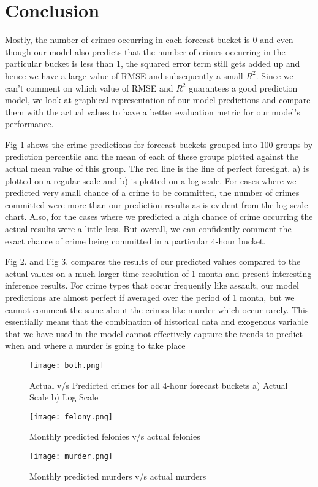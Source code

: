 \documentclass[10pt,journal,compsoc]{IEEEtran}
\begin{document}
\section{Conclusion}
Mostly, the number of crimes occurring in each forecast bucket is 0 and even though our model also predicts that the number of crimes occurring in the particular bucket is less than 1, the squared error term still gets added up and hence we have a large value of RMSE and subsequently a small $R^2$.
Since we can't comment on which value of RMSE and $R^2$ guarantees a good prediction model, we look at graphical representation of our model predictions and compare them with the actual values to have a better evaluation metric for our model's performance.

Fig 1 shows the crime predictions for forecast buckets grouped into 100 groups by prediction percentile and the mean of each of these groups plotted against the actual mean value of this group. The red line is the line of perfect foresight. a) is plotted on a regular scale and b) is plotted on a log scale. For cases where we predicted very small chance of a crime to be committed, the number of crimes committed were more than our prediction results as is evident from the log scale chart. Also, for the cases where we predicted a high chance of crime occurring the actual results were a little less. But overall, we can confidently comment the exact chance of crime being committed in a particular 4-hour bucket.

Fig 2. and  Fig 3. compares the results of our predicted values compared to the actual values on a much larger time resolution of 1 month and present interesting inference results. For crime types that occur frequently like assault, our model predictions are almost perfect if averaged over the period of 1 month, but we cannot comment the same about the crimes like murder which occur rarely. This essentially means that the combination of historical data and exogenous variable that we have used in the model cannot effectively capture the trends to predict when and where a murder is going to take place
\begin{figure}
\centering
  \texttt{[image: both.png]}
  \caption{Actual v/s Predicted crimes for all 4-hour forecast buckets a) Actual Scale b) Log Scale}
\end{figure}
\begin{figure}
\centering
  \texttt{[image: felony.png]}
  \caption{Monthly predicted felonies v/s actual felonies}
\end{figure}
\begin{figure}
\centering
  \texttt{[image: murder.png]}
  \caption{Monthly predicted murders v/s actual murders}
\end{figure}
\end{document}
